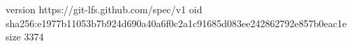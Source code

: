 version https://git-lfs.github.com/spec/v1
oid sha256:e1977b11053b7b924d690a40a6f0c2a1c91685d083ee242862792e857b0eac1e
size 3374
